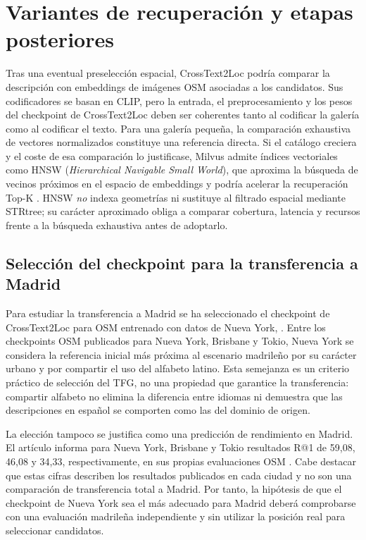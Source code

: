 \section{Variantes de recuperación y etapas posteriores}
\label{sec:recuperadores}
Tras una eventual preselección espacial, CrossText2Loc podría comparar la descripción con embeddings de imágenes OSM asociadas a los candidatos. Sus codificadores se basan en CLIP, pero la entrada, el preprocesamiento y los pesos del checkpoint de CrossText2Loc deben ser coherentes tanto al codificar la galería como al codificar el texto. Para una galería pequeña, la comparación exhaustiva de vectores normalizados constituye una referencia directa. Si el catálogo creciera y el coste de esa comparación lo justificase, Milvus admite índices vectoriales como HNSW (\emph{Hierarchical Navigable Small World}), que aproxima la búsqueda de vecinos próximos en el espacio de embeddings y podría acelerar la recuperación Top-K \cite{malkov2018hnsw,milvus:proyecto}. HNSW \emph{no} indexa geometrías ni sustituye al filtrado espacial mediante STRtree; su carácter aproximado obliga a comparar cobertura, latencia y recursos frente a la búsqueda exhaustiva antes de adoptarlo.

\subsection{Selección del checkpoint para la transferencia a Madrid}
\label{subsec:checkpoint-madrid}
Para estudiar la transferencia a Madrid se ha seleccionado el checkpoint de CrossText2Loc para OSM entrenado con datos de Nueva York, . Entre los checkpoints OSM publicados para Nueva York, Brisbane y Tokio, Nueva York se considera la referencia inicial más próxima al escenario madrileño por su carácter urbano y por compartir el uso del alfabeto latino. Esta semejanza es un criterio práctico de selección del TFG, no una propiedad que garantice la transferencia: compartir alfabeto no elimina la diferencia entre idiomas ni demuestra que las descripciones en español se comporten como las del dominio de origen.

La elección tampoco se justifica como una predicción de rendimiento en Madrid. El artículo informa para Nueva York, Brisbane y Tokio resultados R@1 de 59,08, 46,08 y 34,33, respectivamente, en sus propias evaluaciones OSM \cite{ye2025crosstext}. Cabe destacar que estas cifras describen los resultados publicados en cada ciudad y no son una comparación de transferencia total a Madrid. Por tanto, la hipótesis de que el checkpoint de Nueva York sea el más adecuado para Madrid deberá comprobarse con una evaluación madrileña independiente y sin utilizar la posición real para seleccionar candidatos.

